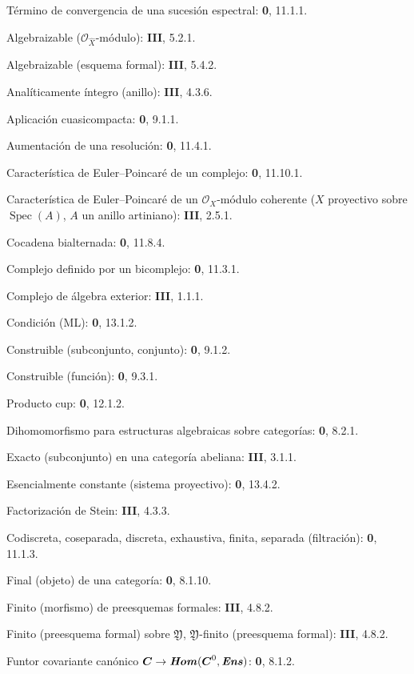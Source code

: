 \documentclass[10pt,oneside,openany]{book}
\theoremstyle{egaenv}\newtheorem*{env}{---}
\theoremstyle{egastatement}
\theoremstyle{egadescription}
\renewcommand{\to}{\mathchoice{\longrightarrow}{\rightarrow}{\rightarrow}{\rightarrow}}
\begin{document}
\begin{flushleft}
Término de convergencia de una sucesión espectral: \textbf 0, 11.1.1.

Algebraizable ($\mathcal O_{\widehat X}$-módulo): \textbf{III}, 5.2.1.

Algebraizable (esquema formal): \textbf{III}, 5.4.2.

Analíticamente íntegro (anillo): \textbf{III}, 4.3.6.

Aplicación cuasicompacta: \textbf 0, 9.1.1.

Aumentación de una resolución: \textbf 0, 11.4.1.

Característica de Euler--Poincaré de un complejo: \textbf 0, 11.10.1.

Característica de Euler--Poincaré de un $\mathcal O_X$-módulo coherente
($X$ proyectivo sobre $\operatorname{Spec}(A)$, $A$ un anillo artiniano): \textbf{III}, 2.5.1.

Cocadena bialternada: \textbf 0, 11.8.4.

Complejo definido por un bicomplejo: \textbf 0, 11.3.1.

Complejo de álgebra exterior: \textbf{III}, 1.1.1.

Condición (ML): \textbf 0, 13.1.2.

Construible (subconjunto, conjunto): \textbf 0, 9.1.2.

Construible (función): \textbf 0, 9.3.1.

Producto cup: \textbf 0, 12.1.2.

Dihomomorfismo para estructuras algebraicas sobre categorías: \textbf 0, 8.2.1.

Exacto (subconjunto) en una categoría abeliana: \textbf{III}, 3.1.1.

Esencialmente constante (sistema proyectivo): \textbf 0, 13.4.2.

Factorización de Stein: \textbf{III}, 4.3.3.

Codiscreta, coseparada, discreta, exhaustiva, finita, separada
(filtración): \textbf 0, 11.1.3.

Final (objeto) de una categoría: \textbf 0, 8.1.10.

Finito (morfismo) de preesquemas formales: \textbf{III}, 4.8.2.

Finito (preesquema formal) sobre $\mathfrak Y$,
$\mathfrak Y$-finito (preesquema formal): \textbf{III}, 4.8.2.

Funtor covariante canónico $\boldsymbol{C}\to\boldsymbol{\mathit{Hom}}(\boldsymbol{C}^0,\boldsymbol{\mathit{Ens}})$: \textbf 0, 8.1.2.


\end{flushleft}
\end{document}

